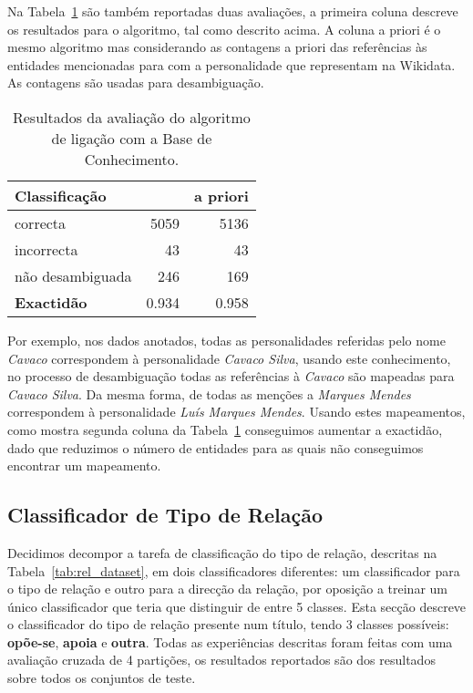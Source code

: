 \documentclass[a4paper, twocolumn, 11pt, twoside]{article}
\begin{document}
Na Tabela~\ref{tab:ent_linking_results} são também reportadas duas avaliações, a primeira coluna descreve os resultados para o algoritmo, tal como descrito acima. A coluna a priori é o mesmo algoritmo mas considerando as contagens a priori das referências às entidades mencionadas para com a personalidade que representam na Wikidata. As contagens são usadas para desambiguação. 

\begin{table}[!h]
    \begin{center}
    \begin{tabular}{l rr}
        {\bf Classificação} &               & {\bf a priori} \\
        \hline
        correcta            &   5059        &  5136    \\
        incorrecta          &     43        &    43    \\
		não desambiguada    &    246        &   169    \\    
        \hline
		{\bf Exactidão }    &  0.934	    &  0.958   \\
    \end{tabular}
	\caption{Resultados da avaliação do algoritmo de ligação com a Base de Conhecimento.}
	\label{tab:ent_linking_results}
	\end{center}
\end{table}


Por exemplo, nos dados anotados, todas as personalidades referidas pelo nome \textit{Cavaco} correspondem à personalidade \textit{Cavaco Silva}, usando este conhecimento, no processo de desambiguação todas as referências à \textit{Cavaco} são mapeadas para \textit{Cavaco Silva}. Da mesma forma, de todas as menções a \textit{Marques Mendes} correspondem à personalidade \textit{Luís Marques Mendes}. Usando estes mapeamentos, como mostra segunda coluna da Tabela~\ref{tab:ent_linking_results} conseguimos aumentar a exactidão, dado que reduzimos o número de entidades para as quais não conseguimos encontrar um mapeamento.

\subsection{Classificador de Tipo de Relação}
\label{subsec:rel_classifier}

Decidimos decompor a tarefa de classificação do tipo de relação, descritas na Tabela~\ref{tab:rel_dataset}, em dois classificadores diferentes: um classificador para o tipo de relação e outro para a direcção da relação, por oposição a treinar um único classificador que teria que distinguir de entre 5 classes. Esta secção descreve o classificador do tipo de relação presente num título, tendo 3 classes possíveis: \textbf{opõe-se}, \textbf{apoia} e \textbf{outra}. Todas as experiências descritas foram feitas com uma avaliação cruzada de 4 partições, os resultados reportados são dos resultados sobre todos os conjuntos de teste.
\end{document}
